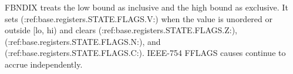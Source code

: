 FBNDIX treats the low bound as inclusive and the high bound as exclusive. It sets (:ref:base.registers.STATE.FLAGS.V:) when the value is unordered or outside [lo, hi) and clears (:ref:base.registers.STATE.FLAGS.Z:), (:ref:base.registers.STATE.FLAGS.N:), and (:ref:base.registers.STATE.FLAGS.C:). IEEE-754 FFLAGS causes continue to accrue independently.

